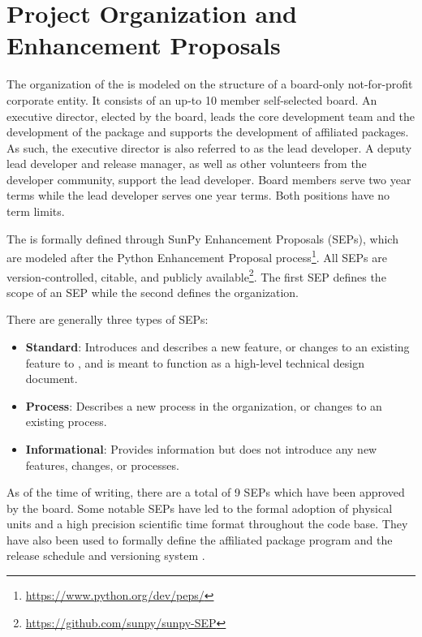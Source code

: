 \section{Project Organization and Enhancement Proposals}
\label{sec:proj_org}

The organization of the \sunpyproj is modeled on the structure of a board-only not-for-profit corporate entity.
It consists of an up-to 10 member self-selected board.
An executive director, elected by the board, leads the core development team and the development of the \sunpypkg  package and supports the development of affiliated packages.
As such, the executive director is also referred to as the lead developer.
A deputy lead developer and release manager, as well as other volunteers from the developer community, support the lead developer.
Board members serve two year terms while the lead developer serves one year terms. Both positions have no term limits.

The \sunpyproj is formally defined through SunPy Enhancement Proposals (SEPs), which are modeled after the Python Enhancement Proposal process\footnote{\url{https://www.python.org/dev/peps/}}.
All SEPs are version-controlled, citable, and publicly available\footnote{\url{https://github.com/sunpy/sunpy-SEP}}.
The first SEP \citep[SEP-0001][]{sep-0001} defines the scope of an SEP \citep[similar to][]{ape-0001} while the second \citep[SEP-0002][]{sep-0002} defines the  \sunpyproj organization.

There are generally three types of SEPs:
\begin{itemize}
    \item \textbf{Standard}: Introduces and describes a new feature, or changes to an existing feature to \sunpypkg, and is meant to function as a high-level technical design document.
    \item \textbf{Process}: Describes a new process in the organization, or changes to an existing process.
    \item \textbf{Informational}: Provides information but does not introduce any new features, changes, or processes.
\end{itemize}

As of the time of writing, there are a total of 9 SEPs which have been approved by the board.
Some notable SEPs have led to the formal adoption of physical units \citep[SEP-0003,][see \autoref{sec:units}]{sep-0003}  and a high precision scientific time format \citep[SEP-0008,][see \autoref{sec:units}]{sep-0008} throughout the code base.
They have also been used to formally define the affiliated package program \citep[SEP-0004,][see \autoref{sec:affil_package}]{sep-0004} and the release schedule and versioning system \citep[SEP-0009,][see \autoref{sec:release}]{sep-0009}.
